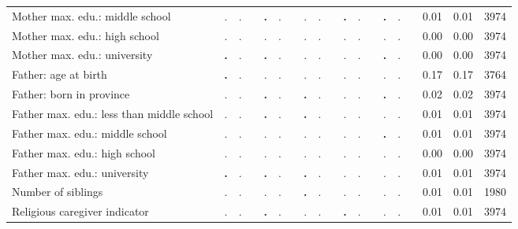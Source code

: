 \begin{tabular}{l c c c c c c c c c c c c c c c c c c}
Mother max. edu.: middle school &         . &         . & & \textbf{        .} &         . & &         . &         . & & \textbf{        .} &         . & & \textbf{        .} &         . & &      0.01 &      0.01 &      3974 \\
Mother max. edu.: high school &         . &         . & &         . &         . & &         . &         . & &         . &         . & &         . &         . & &      0.00 &      0.00 &      3974 \\
Mother max. edu.: university & \textbf{        .} &         . & & \textbf{        .} &         . & &         . &         . & &         . &         . & & \textbf{        .} &         . & &      0.00 &      0.00 &      3974 \\
Father: age at birth & \textbf{        .} &         . & &         . &         . & &         . &         . & &         . &         . & &         . &         . & &      0.17 &      0.17 &      3764 \\
Father: born in province &         . &         . & & \textbf{        .} &         . & & \textbf{        .} &         . & &         . &         . & & \textbf{        .} &         . & &      0.02 &      0.02 &      3974 \\
Father max. edu.: less than middle school &         . &         . & & \textbf{        .} &         . & & \textbf{        .} &         . & &         . &         . & &         . &         . & &      0.01 &      0.01 &      3974 \\
Father max. edu.: middle school &         . &         . & &         . &         . & &         . &         . & &         . &         . & & \textbf{        .} &         . & &      0.01 &      0.01 &      3974 \\
Father max. edu.: high school &         . &         . & &         . &         . & &         . &         . & &         . &         . & &         . &         . & &      0.00 &      0.00 &      3974 \\
Father max. edu.: university & \textbf{        .} &         . & & \textbf{        .} &         . & & \textbf{        .} &         . & &         . &         . & &         . &         . & &      0.01 &      0.01 &      3974 \\
Number of siblings &         . &         . & &         . &         . & & \textbf{        .} &         . & &         . &         . & &         . &         . & &      0.01 &      0.01 &      1980 \\
Religious caregiver indicator &         . &         . & & \textbf{        .} &         . & &         . &         . & & \textbf{        .} &         . & &         . &         . & &      0.01 &      0.01 &      3974 \\

\end{tabular}
